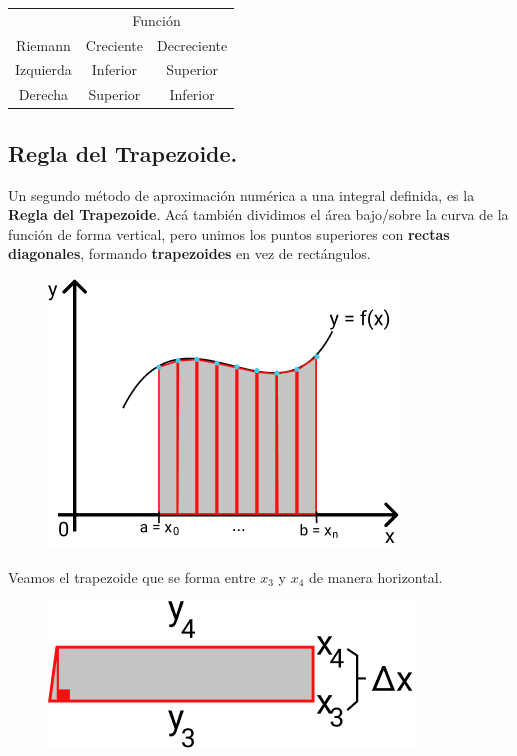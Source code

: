 \documentclass[12pt]{article}
\begin{document}
\begin{table}[hbt!]
\centering

\begin{tabular}{c c c}
\hline
& \multicolumn{2}{c}{Función} \\
\cline{2-3}
Riemann & Creciente & Decreciente \\
\hline
Izquierda & Inferior & Superior \\
Derecha & Superior & Inferior \\
\hline
\end{tabular}

\end{table}

\subsection{Regla del Trapezoide.}

Un segundo método de aproximación numérica a una integral definida, es la \textbf{Regla del Trapezoide}. Acá también dividimos el área bajo/sobre la curva de la función de forma vertical, pero unimos los puntos superiores con \textbf{rectas diagonales}, formando \textbf{trapezoides} en vez de rectángulos.

\newpage

\begin{figure}[hbt!]
\centering
\includegraphics[scale=0.6]{img/trapezoidal-rule-num-int.jpg}
\end{figure}

Veamos el trapezoide que se forma entre $x_{3}$ y $x_{4}$ de manera horizontal.

\begin{figure}[hbt!]
\centering
\includegraphics[scale=0.6]{img/trapezoidal-rule-num-int-2.jpg}
\end{figure}
\end{document}

